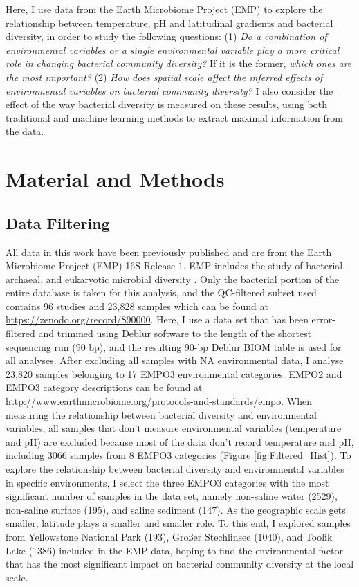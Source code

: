 \documentclass[11pt, a4paper]{article}
\begin{document}
\begin{spacing}{1.5}
Here, I use data from the Earth Microbiome Project (EMP) \citep{thompson2017communal} to explore the relationship between temperature, pH and latitudinal gradients and bacterial diversity, in order to study the following questions: (1) \textit{Do a combination of environmental variables or a single environmental variable play a more critical role in changing bacterial community diversity?} If it is the former, \textit{which ones are the most important?} (2) \textit{How does spatial scale affect the inferred effects of environmental variables on bacterial community diversity?} I also consider the effect of the way bacterial diversity is measured on these results, using both traditional and machine learning methods to extract maximal information from the data. 

\section{Material and Methods}

\subsection{Data Filtering}

All data in this work have been previously published and  are from the Earth Microbiome Project (EMP) 16S Release 1. EMP includes the study of bacterial, archaeal, and eukaryotic microbial diversity \citep{thompson2017communal}. Only the bacterial portion of the entire database is taken for this analysis, and the QC-filtered subset used contains 96 studies and 23,828 samples which can be found at \href{https://zenodo.org/record/890000}{https://zenodo.org/record/890000}. Here, I use a data set that has been error-filtered and trimmed using Deblur software to the length of the shortest sequencing run (90 bp), and the resulting 90-bp Deblur BIOM table is used for all analyses. After excluding all samples with NA environmental data, I analyse 23,820 samples belonging to 17 EMPO3 environmental categories. EMPO2 and EMPO3 category descriptions can be found at \href{http://www.earthmicrobiome.org/protocols-and-standards/empo}{http://www.earthmicrobiome.org/protocols-and-standards/empo}. When measuring the relationship between bacterial diversity and environmental variables, all samples that don't measure environmental variables (temperature and pH) are excluded because most of the data don't record temperature and pH, including 3066 samples from 8 EMPO3 categories (Figure \ref{fig:Filtered_Hist}). To explore the relationship between bacterial diversity and environmental variables in specific environments, I select the three EMPO3 categories with the most significant number of samples in the data set, namely non-saline water (2529), non-saline surface (195), and saline sediment (147). As the geographic scale gets smaller, latitude plays a smaller and smaller role. To this end, I explored samples from Yellowstone National Park (193), Großer Stechlinsee (1040), and Toolik Lake (1386) \citep{crump2012microbial} included in the EMP data, hoping to find the environmental factor that has the most significant impact on bacterial community diversity at the local scale.


\end{spacing}
\end{document}
